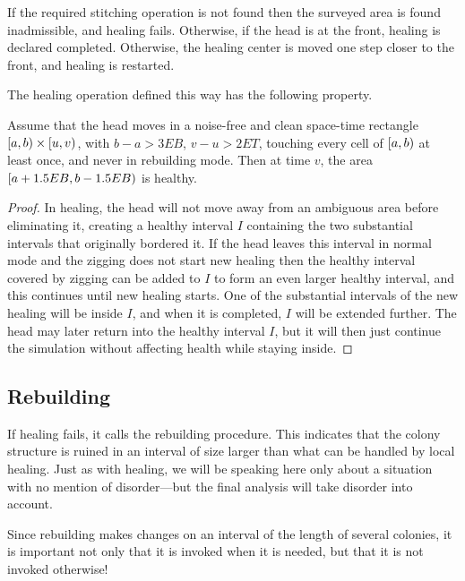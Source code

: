\documentclass[11pt]{memoir}
\theoremstyle{definition} %
\def\B{B}
\newcommand{\E}{E}
\newcommand{\Tu}{T}
\begin{document}
If the required stitching operation is not found then
the surveyed area is found inadmissible, and healing fails.
Otherwise, if the head is at the front, healing is declared completed.
Otherwise, the healing center is moved one step closer to the front, and healing is restarted.

The healing operation defined this way has the following property.

\begin{lemma}\label{lem:combined-heals}
  Assume that the head moves in a noise-free and clean space-time rectangle
  \( \left[a,b\right)\times \left[u,v\right) \), with \( b-a>3\E\B \), \( v-u>2\E\Tu \),
touching every cell of \( \left[a,b\right) \) at least once, and never in rebuilding mode.
Then at time \( v \), the area \( \lint{a+1.5\E\B}{b-1.5\E\B} \) is healthy.
\end{lemma}
\begin{proof}
  In healing, the head will not move away from an ambiguous area before eliminating it,
  creating a healthy interval
\( I \) containing the two substantial intervals that originally bordered it.
If the head leaves this interval in normal mode and the zigging does not start new healing then the
healthy interval covered by zigging can be added to \( I \) to form an even larger healthy interval,
and this continues until new healing starts.
One of the substantial intervals of the new healing will be inside \( I \), and when it is completed,
\( I \) will be extended further.
The head may later return into the healthy interval \( I \),
but it will then just continue the simulation without
affecting health while staying inside.  
\end{proof}

\subsection{Rebuilding}\label{sec:rebuilding}

If healing fails, it calls the rebuilding procedure.
This indicates that the colony structure is ruined in an interval of size larger than 
what can be handled by local healing.
Just as with healing, we will be speaking here only about a situation with no 
mention of disorder---but the final analysis will take disorder into account.

Since rebuilding makes changes on an interval of the length of several colonies,
it is important not only that it is invoked when it is needed, but that it is not
invoked otherwise!
\end{document}
